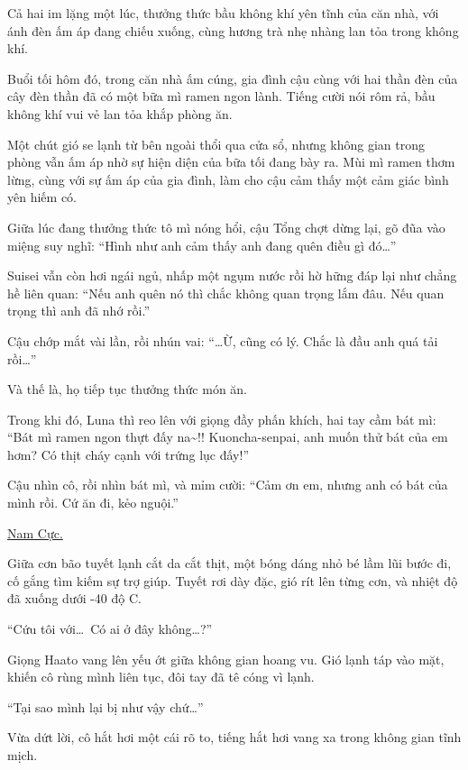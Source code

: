 \documentclass[../main.tex]{subfiles}
\begin{document}
Cả hai im lặng một lúc, thưởng thức bầu không khí yên tĩnh của căn nhà, với ánh đèn ấm áp đang chiếu xuống, cùng hương trà nhẹ nhàng lan tỏa trong không khí.

\ct

Buổi tối hôm đó, trong căn nhà ấm cúng, gia đình cậu cùng với hai thần đèn của cây đèn thần đã có một bữa mì ramen ngon lành. Tiếng cười nói rôm rả, bầu không khí vui vẻ lan tỏa khắp phòng ăn.

Một chút gió se lạnh từ bên ngoài thổi qua cửa sổ, nhưng không gian trong phòng vẫn ấm áp nhờ sự hiện diện của bữa tối đang bày ra. Mùi mì ramen thơm lừng, cùng với sự ấm áp của gia đình, làm cho cậu cảm thấy một cảm giác bình yên hiếm có.

Giữa lúc đang thưởng thức tô mì nóng hổi, cậu Tổng chợt dừng lại, gõ đũa vào miệng suy nghĩ: ``Hình như anh cảm thấy anh đang quên điều gì đó\dots''

Suisei vẫn còn hơi ngái ngủ, nhấp một ngụm nước rồi hờ hững đáp lại như chẳng hề liên quan: ``Nếu anh quên nó thì chắc không quan trọng lắm đâu. Nếu quan trọng thì anh đã nhớ rồi.''

Cậu chớp mắt vài lần, rồi nhún vai: ``\dots Ừ, cũng có lý. Chắc là đầu anh quá tải rồi\dots''

Và thế là, họ tiếp tục thưởng thức món ăn.

Trong khi đó, Luna thì reo lên với giọng đầy phấn khích, hai tay cầm bát mì: ``Bát mì ramen ngon thựt đấy na\~{}!! Kuoncha-senpai, anh muốn thử bát của em hơm? Có thịt cháy cạnh với trứng lục đấy!''

Cậu nhìn cô, rồi nhìn bát mì, và mỉm cười: ``Cảm ơn em, nhưng anh có bát của mình rồi. Cứ ăn đi, kẻo nguội.''

\begin{center}
  \uline{Nam Cực.}
\end{center}

Giữa cơn bão tuyết lạnh cắt da cắt thịt, một bóng dáng nhỏ bé lầm lũi bước đi, cố gắng tìm kiếm sự trợ giúp. Tuyết rơi dày đặc, gió rít lên từng cơn, và nhiệt độ đã xuống dưới -40 độ C.

``Cứu tôi với\dots\ Có ai ở đây không\dots?''

Giọng Haato vang lên yếu ớt giữa không gian hoang vu. Gió lạnh táp vào mặt, khiến cô rùng mình liên tục, đôi tay đã tê cóng vì lạnh.

``Tại sao mình lại bị như vậy chứ\dots''

Vừa dứt lời, cô hắt hơi một cái rõ to, tiếng hắt hơi vang xa trong không gian tĩnh mịch.
\end{document}
